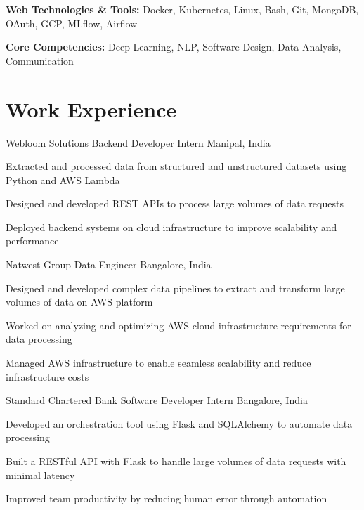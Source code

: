 \documentclass[letterpaper]{resume_config}
\begin{document}
\noindent
\textbf{Web Technologies \& Tools:} Docker, Kubernetes, Linux, Bash, Git, MongoDB, OAuth, GCP, MLflow, Airflow

\noindent
\textbf{Core Competencies:} Deep Learning, NLP, Software Design, Data Analysis, Communication

\vspace{-7pt}



\section{Work Experience}
\WorkExperience
{Webloom Solutions}
{Backend Developer Intern}
{Manipal, India}
{ }
{
    \item Extracted and processed data from structured and unstructured datasets using Python and AWS Lambda

    \item Designed and developed REST APIs to process large volumes of data requests

    \item Deployed backend systems on cloud infrastructure to improve scalability and performance

}
\vspace{2pt}
\WorkExperience
{Natwest Group}
{Data Engineer}
{Bangalore, India}
{ }
{
    \item Designed and developed complex data pipelines to extract and transform large volumes of data on AWS platform

    \item Worked on analyzing and optimizing AWS cloud infrastructure requirements for data processing

    \item Managed AWS infrastructure to enable seamless scalability and reduce infrastructure costs

}
\vspace{2pt}
\WorkExperience
{Standard Chartered Bank}
{Software Developer Intern}
{Bangalore, India}
{ }
{
    \item Developed an orchestration tool using Flask and SQLAlchemy to automate data processing

    \item Built a RESTful API with Flask to handle large volumes of data requests with minimal latency

    \item Improved team productivity by reducing human error through automation

}
\vspace{-7pt}
\end{document}

